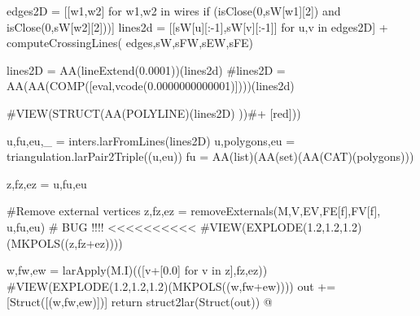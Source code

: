 \documentclass[11pt,oneside]{article}    %
\begin{document}
{        edges2D = [[w1,w2] for w1,w2 in wires if (isClose(0,sW[w1][2]) and isClose(0,sW[w2][2]))]
        lines2d = [[sW[u][:-1],sW[v][:-1]] for u,v in edges2D] + computeCrossingLines(
                    edges,sW,sFW,sEW,sFE)
                    
        lines2D = AA(lineExtend(0.0001))(lines2d)
        #lines2D = AA(AA(COMP([eval,vcode(0.0000000000001)])))(lines2d)          

        #VIEW(STRUCT(AA(POLYLINE)(lines2D) ))#+ [red]))
        
        u,fu,eu,_ = inters.larFromLines(lines2D)
        u,polygons,eu = triangulation.larPair2Triple((u,eu))
        fu = AA(list)(AA(set)(AA(CAT)(polygons)))
        
        z,fz,ez = u,fu,eu
        
        #Remove external vertices 
        z,fz,ez = removeExternals(M,V,EV,FE[f],FV[f], u,fu,eu)  # BUG !!!!  <<<<<<<<<<
        #VIEW(EXPLODE(1.2,1.2,1.2)(MKPOLS((z,fz+ez))))
        
        
        w,fw,ew = larApply(M.I)(([v+[0.0] for v in z],fz,ez))
        #VIEW(EXPLODE(1.2,1.2,1.2)(MKPOLS((w,fw+ew))))
        out += [Struct([(w,fw,ew)])]
    return struct2lar(Struct(out))
@}
\end{document}
